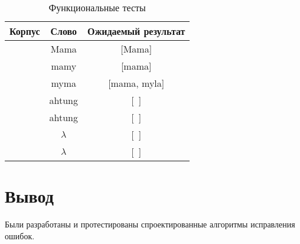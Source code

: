 \begin{table}[ht]
	\small
	\begin{center}
		\begin{threeparttable}
			\caption{Функциональные тесты}
			\label{tbl:func_tests}
			\begin{tabular}{|c|c|c|}
				\hline
				\bfseries Корпус
				& \bfseries Слово
				& \bfseries Ожидаемый результат \\ 
				\hline
				[Mama, Myla, Ramu] & Mama & [Mama] \\
				\hline
				[Mama, Myla, Ramu]  & mamy & [mama] \\
				\hline
				[Mama, Myla, Ramu]  & myma & [mama, myla] \\
				\hline
				[Mama, Myla, Ramu]  & ahtung & [~] \\
				\hline
				[~]  & ahtung & [~] \\
				\hline
				[~]  & $\lambda$ & [~] \\
				\hline
				[Мама, Мыла, Раму]  & $\lambda$ & [~] \\
				\hline
			\end{tabular}	
		\end{threeparttable}	
	\end{center}
\end{table}


\section*{Вывод}
Были разработаны и протестированы спроектированные алгоритмы исправления ошибок.

